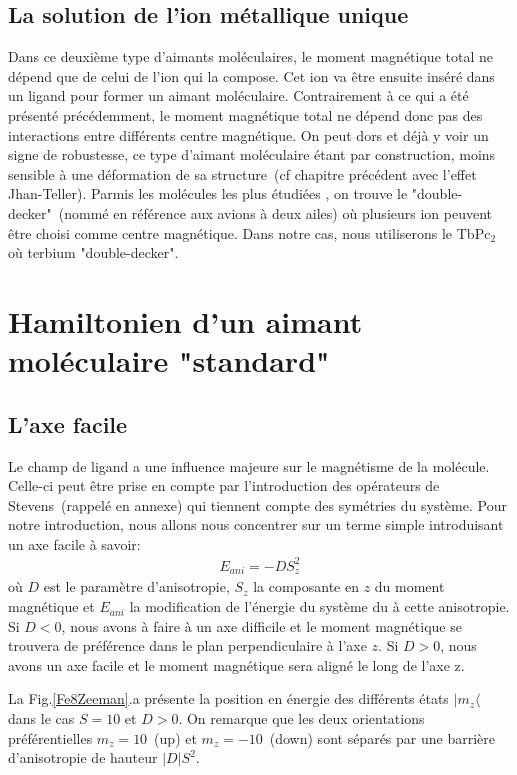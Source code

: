 \subsection{La solution de l'ion métallique unique}
Dans ce deuxième type d'aimants moléculaires, le moment magnétique total ne dépend que de celui de l'ion qui la compose. Cet ion va \^etre ensuite inséré dans un ligand pour former un aimant moléculaire. Contrairement à ce qui a été présenté précédemment, le moment magnétique total ne dépend donc pas des interactions entre différents centre magnétique. On peut dors et déjà y voir un signe de robustesse, ce type d'aimant moléculaire étant par construction, moins sensible à une déformation de sa structure~(cf chapitre précédent avec l'effet Jhan-Teller). Parmis les molécules les plus étudiées , on trouve le "double-decker"~(nommé en référence aux avions à deux ailes) où plusieurs ion peuvent \^etre choisi comme centre magnétique. Dans notre cas, nous utiliserons le TbPc$_2$ où terbium "double-decker".



\section{Hamiltonien d'un aimant moléculaire "standard"}
\subsection{L'axe facile}
Le champ de ligand a une influence majeure sur le magnétisme de la molécule. Celle-ci peut \^etre prise en compte par l'introduction des opérateurs de Stevens~(rappelé en annexe) qui tiennent compte des symétries du système. Pour notre introduction, nous allons nous concentrer sur un terme simple introduisant un axe facile à savoir:
 \begin{eqnarray}
E_{ani} = -DS_z^2 \nonumber
\end{eqnarray}
où $D$ est le paramètre d'anisotropie, $S_z$ la composante en $z$ du moment magnétique et $E_{ani}$ la modification de l'énergie du système du à cette anisotropie. Si $D<0$, nous avons à faire à un axe difficile et le moment magnétique se trouvera de préférence dans le plan perpendiculaire à l'axe $z$. Si $D>0$, nous avons un axe facile et le moment magnétique sera aligné le long de l'axe z.

La Fig.\ref{Fe8Zeeman}.a présente la position en énergie des différents états $|m_z \langle$ dans le cas $S=10$ et $D>0$. On remarque que les deux orientations préférentielles $m_z=10$~(up) et $m_z=-10$~(down) sont séparés par une barrière d'anisotropie de hauteur $|D|S^2$.

